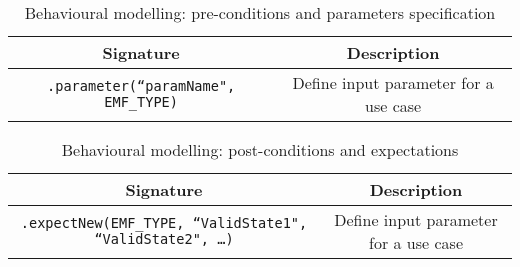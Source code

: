 %
%
\begin{table*}[!t]
\caption{Behavioural modelling: pre-conditions and parameters specification}
\label{tbl:behavioural-modelling-preconditions}
\centering
\begin{tabular}{|c||c|}
\hline
Signature & Description\\
\hline
\texttt{.parameter(``paramName", EMF\_TYPE)} & Define input parameter for a use case \\
\hline
\end{tabular}
\end{table*}

\begin{table*}[!t]
\caption{Behavioural modelling: post-conditions and expectations}
\label{tbl:behavioural-modelling-postconditions}
\centering
\begin{tabular}{|c||c|}
\hline
Signature & Description\\
\hline
\texttt{.expectNew(EMF\_TYPE, ``ValidState1", ``ValidState2", \ldots)} & Define input parameter for a use case \\
\hline
\end{tabular}
\end{table*}
